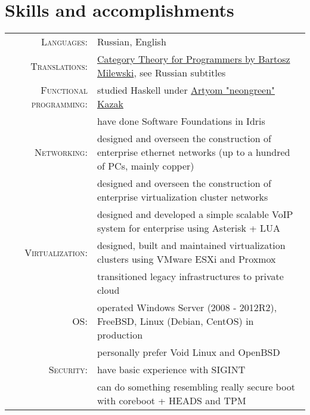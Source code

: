 \documentclass[a4paper,11pt]{article}
\begin{document}
  \section{Skills and accomplishments}
    \begin{longtable}{rp{}}
      \textsc{Languages:} & Russian, English \\

      \textsc{Translations:} & \href{https://www.youtube.com/playlist?list=PLbgaMIhjbmEnaH\_LTkxLI7FMa2HsnawM\_}
                               {Category Theory for Programmers by Bartosz Milewski}, see Russian subtitles      \\

      \textsc{Functional programming:} & studied Haskell under \href{https://artyom.me}{Artyom "neongreen" Kazak} \\
                                       & have done Software Foundations in Idris                                  \\

      \textsc{Networking:} & designed and overseen the construction of enterprise ethernet
                             networks (up to a hundred of PCs, mainly copper)                    \\
                           & designed and overseen the construction of enterprise virtualization
                             cluster networks                                                    \\
                           & designed and developed a simple scalable VoIP system for enterprise
                             using Asterisk + LUA                                                \\

      \textsc{Virtualization:} & designed, built and maintained virtualization clusters using VMware ESXi and Proxmox \\
                               & transitioned legacy infrastructures to private cloud                                 \\

      \textsc{OS:} & operated Windows Server (2008 - 2012R2), FreeBSD, Linux (Debian, CentOS) in production \\
                   & personally prefer Void Linux and OpenBSD                                               \\

      \textsc{Security:} & have basic experience with SIGINT                                            \\
                         & can do something resembling really secure boot with coreboot + HEADS and TPM \\
    \end{longtable}
\end{document}
